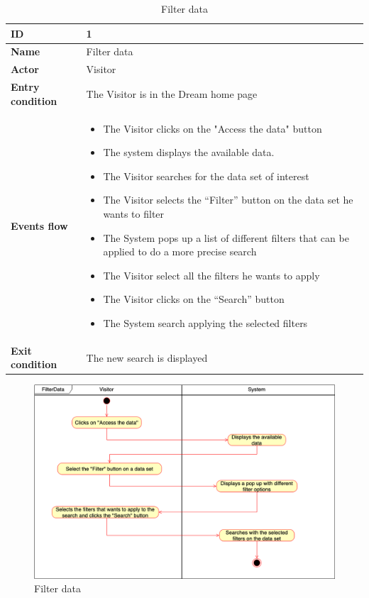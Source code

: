 \begin{longtable}{p{} | p{}}
\caption{Filter data}
    \label{tab:filter_data}\\
        \hline
        \textbf{ID} & 1\\
        \hline
        \textbf{Name}  &  Filter data\\
        \hline
        \textbf{Actor}  &  Visitor\\
        \hline
        \textbf{Entry condition}  & The Visitor is in the Dream home page\\
    
        \hline
        \textbf{Events flow} & \begin{itemize}
                \item The Visitor clicks on the "Access the data" button
                \item The system displays the available data.
                \item The Visitor searches for the data set of interest
                \item The Visitor selects the “Filter” button on the data set he wants to filter
                \item The System pops up a list of different filters that can be applied to do a more precise search
                \item The Visitor select all the filters he wants to apply
                \item The Visitor clicks on the “Search” button
                \item The System search applying the selected filters

                \end{itemize}
                 \\
        \hline
        \textbf{Exit condition} & The new search is displayed\\
        \hline
    

    \end{longtable}
     \begin{figure}[h!]
        \centering
        \includegraphics[scale=0.35]{images/use_cases_diagram/visitor_filter_data.png}
        \caption{Filter data}
        \label{fig:filter_data}
    \end{figure}
   
